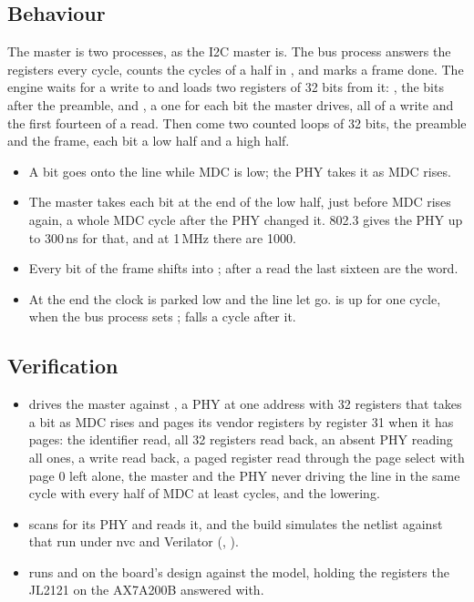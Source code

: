 \subsection*{Behaviour}

The master is two processes, as the I2C master is. The bus process
answers the registers every cycle, counts the cycles of a half in
, and marks a frame done. The engine waits for a write to
 and loads two registers of 32 bits from it: ,
the bits after the preamble, and , a one for each bit the
master drives, all of a write and the first fourteen of a read. Then
come two counted loops of 32 bits, the preamble and the frame, each
bit a low half and a high half.

\begin{itemize}
\item A bit goes onto the line while MDC is low; the PHY takes it as
MDC rises.
\item The master takes each bit at the end of the low half, just
before MDC rises again, a whole MDC cycle after the PHY changed it.
802.3 gives the PHY up to 300\,ns for that, and at 1\,MHz there are
1000.
\item Every bit of the frame shifts into ; after a read the
last sixteen are the word.
\item At the end the clock is parked low and the line let go.
 is up for one cycle, when the bus process sets
;  falls a cycle after it.
\end{itemize}

\subsection*{Verification}

\begin{itemize}
\item {} drives the master against
, a PHY at one address with 32 registers that
takes a bit as MDC rises and pages its vendor registers by register
31 when it has pages: the identifier read, all 32 registers read
back, an absent PHY reading all ones, a write read back, a paged
register read through the page select with page 0 left alone, the
master and the PHY never driving the line in the same cycle with
every half of MDC at least  cycles, and the lowering.
\item {} scans for its PHY and reads it,
and the build simulates the netlist against that run under nvc and
Verilator (,
).
\item {} runs  and
 on the board's design against the model, holding the
registers the JL2121 on the AX7A200B answered with.
\end{itemize}

